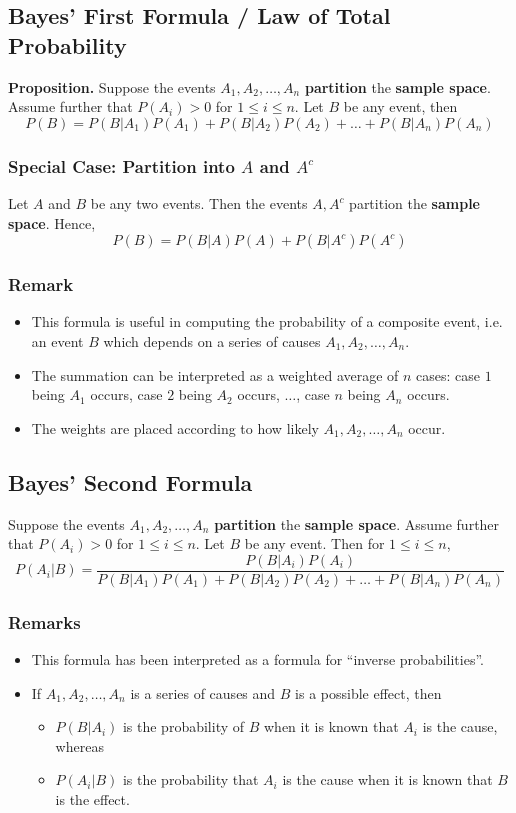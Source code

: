 \documentclass[../st2131_notes.tex]{subfiles}
\begin{document}
\subsection{Bayes' First Formula / Law of Total Probability}
\textbf{Proposition.} Suppose the events \(A_1,A_2,\ldots,A_n\) \textbf{partition} the \textbf{sample space}. Assume further that \(P(A_i)>0\) for \(1\leq i\leq n\). Let \(B\) be any event, then
\[P(B)=P(B\vert A_1)P(A_1)+P(B\vert A_2)P(A_2)+\ldots+P(B\vert A_n)P(A_n)\]

\subsubsection{Special Case: Partition into $A$ and $A^c$}
Let \(A\) and \(B\) be any two events. Then the events \(A,A^c\) partition the \textbf{sample space}. Hence,
\[P(B)=P(B\vert A)P(A)+P(B\vert A^c)P(A^c)\]

\subsubsection{Remark}
\begin{itemize}
	\item This formula is useful in computing the probability of a composite event, i.e. an event \(B\) which depends on a series of causes \(A_1,A_2,\ldots,A_n\).
	\item The summation can be interpreted as a weighted average of \(n\) cases: case \(1\) being \(A_1\) occurs, case \(2\) being \(A_2\) occurs, \(\ldots\), case \(n\) being \(A_n\) occurs.
	\item The weights are placed according to how likely \(A_1,A_2,\ldots,A_n\) occur.
\end{itemize}

\subsection{Bayes' Second Formula}
Suppose the events \(A_1,A_2,\ldots,A_n\) \textbf{partition} the \textbf{sample space}. Assume further that \(P(A_i)>0\) for \(1\leq i\leq n\). Let \(B\) be any event. Then for \(1\leq i\leq n\),
\[P(A_i\vert B)=\frac{P(B\vert A_i)P(A_i)}{P(B\vert A_1)P(A_1)+P(B\vert A_2)P(A_2)+\ldots+P(B\vert A_n)P(A_n)}\]

\subsubsection{Remarks}
\begin{itemize}
	\item This formula has been interpreted as a formula for ``inverse probabilities''.
	\item If \(A_1,A_2,\ldots,A_n\) is a series of causes and \(B\) is a possible effect, then
	\begin{itemize}
		\item\(P(B\vert A_i)\) is the probability of \(B\) when it is known that \(A_i\) is the cause, whereas
		\item\(P(A_i\vert B)\) is the probability that \(A_i\) is the cause when it is known that \(B\) is the effect.
	\end{itemize}
\end{itemize}
\end{document}
